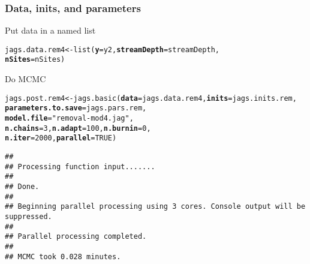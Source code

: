 \documentclass[color=usenames,dvipsnames]{beamer}\usepackage[]{graphicx}\usepackage[]{color}
\makeatletter
\newcommand{\hlnum}[1]{\textcolor[rgb]{0.69,0.494,0}{#1}}%
\newcommand{\hlstr}[1]{\textcolor[rgb]{0.749,0.012,0.012}{#1}}%
\newcommand{\hlstd}[1]{\textcolor[rgb]{0,0,0}{#1}}%
\newcommand{\hlkwb}[1]{\textcolor[rgb]{0,0.341,0.682}{#1}}%
\newcommand{\hlkwc}[1]{\textcolor[rgb]{0,0,0}{\textbf{#1}}}%
\newcommand{\hlkwd}[1]{\textcolor[rgb]{0.004,0.004,0.506}{#1}}%
\newenvironment{kframe}{%
 \def\at@end@of@kframe{}%
 \ifinner\ifhmode%
  \def\at@end@of@kframe{\end{minipage}}%
  \begin{minipage}{\columnwidth}%
 \fi\fi%
 \def\FrameCommand##1{\hskip\@totalleftmargin \hskip-\fboxsep
 \colorbox{shadecolor}{##1}\hskip-\fboxsep
     \hskip-\linewidth \hskip-\@totalleftmargin \hskip\columnwidth}%
 \MakeFramed {\advance\hsize-\width
   \@totalleftmargin\z@ \linewidth\hsize
   \@setminipage}}%
 {\par\unskip\endMakeFramed%
 \at@end@of@kframe}
\newenvironment{knitrout}{}{} %
\makeatother
\begin{document}
\begin{frame}[fragile]
  \frametitle{Data, inits, and parameters}
  Put data in a named list
  \vspace{-12pt}
\begin{knitrout}\small
{}\color{fgcolor}\begin{kframe}
\begin{alltt}
\hlstd{jags.data.rem4} \hlkwb{<-} \hlkwd{list}\hlstd{(}\hlkwc{y}\hlstd{=y2,} \hlkwc{streamDepth}\hlstd{=streamDepth,}
                       \hlkwc{nSites}\hlstd{=nSites)}
\end{alltt}
\end{kframe}
\end{knitrout}
\vfill
  Do MCMC
\begin{knitrout}\scriptsize
{}\color{fgcolor}\begin{kframe}
\begin{alltt}
\hlstd{jags.post.rem4} \hlkwb{<-} \hlkwd{jags.basic}\hlstd{(}\hlkwc{data}\hlstd{=jags.data.rem4,} \hlkwc{inits}\hlstd{=jags.inits.rem,}
                             \hlkwc{parameters.to.save}\hlstd{=jags.pars.rem,}
                             \hlkwc{model.file}\hlstd{=}\hlstr{"removal-mod4.jag"}\hlstd{,}
                             \hlkwc{n.chains}\hlstd{=}\hlnum{3}\hlstd{,} \hlkwc{n.adapt}\hlstd{=}\hlnum{100}\hlstd{,} \hlkwc{n.burnin}\hlstd{=}\hlnum{0}\hlstd{,}
                             \hlkwc{n.iter}\hlstd{=}\hlnum{2000}\hlstd{,} \hlkwc{parallel}\hlstd{=}\hlnum{TRUE}\hlstd{)}
\end{alltt}
\begin{verbatim}
## 
## Processing function input....... 
## 
## Done. 
##  
## Beginning parallel processing using 3 cores. Console output will be suppressed.
## 
## Parallel processing completed.
## 
## MCMC took 0.028 minutes.
\end{verbatim}
\end{kframe}
\end{knitrout}
\end{frame}
\end{document}
